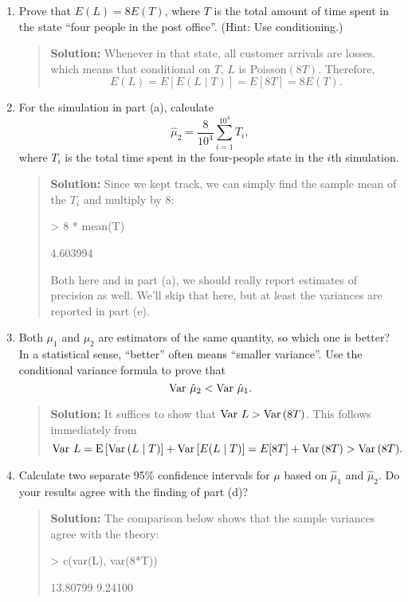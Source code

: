 \documentclass{article}
\def\E{\mathop{\rm E\,}\nolimits}
\def\Var{\mathop{\rm Var\,}\nolimits}
\begin{document}
\begin{enumerate}
\begin{enumerate}
    \item Prove that $E(L)=8E(T)$, where $T$ is the total amount of time spent
    in the state ``four people in the post office''. (Hint: Use conditioning.)
    \begin{quotation}{\bf Solution:}
    Whenever in that state, all customer arrivals are losses. which means
    that conditional on $T$, $L$ is Poisson$(8T)$.  Therefore,
    \[
    E(L) = E [ E(L\mid T)] = E[8T] = 8E(T).
    \]
    \end{quotation}

    \item For the simulation in part (a), calculate
    \[
    \hat\mu_2 = \frac{8}{10^4} \sum_{i=1}^{10^4} T_i,
    \]
    where $T_i$ is the total time spent in the four-people state in the $i$th
    simulation.
    \begin{quotation}{\bf Solution:}
    Since we kept track, we can simply find the sample mean of the $T_i$ and
    multiply by 8:
\begin{Schunk}
\begin{Sinput}
> 8 * mean(T)
\end{Sinput}
\begin{Soutput}
[1] 4.603994
\end{Soutput}
\end{Schunk}
    Both here and in part (a), we should really report estimates of precision as
    well.  We'll skip that here, but at least the variances are reported in part (e).
    \end{quotation}
    
    \item Both $\mu_1$ and $\mu_2$ are estimators of the same quantity, so which
    one is better? In a statistical sense, ``better'' often means ``smaller
    variance''. Use the conditional variance formula to prove that
    \[
    \Var \hat \mu_2 < \Var \hat\mu_1.
    \]
    \begin{quotation}{\bf Solution:}
    It suffices to show that $\Var L>\Var(8T)$.  This follows immediately from
    \[
    \Var L = \E [ \Var (L\mid T)] + \Var[ E(L\mid T)] = 
    E[ 8T ] + \Var (8T) > \Var (8T).
    \]
    \end{quotation}

    \item Calculate two separate 95\% confidence intervals for $\mu$ based on
    $\hat\mu_1$ and $\hat\mu_2$. Do your results agree with the finding of part
    (d)?
    \begin{quotation}{\bf Solution:}
    The comparison below shows that the sample variances agree with the theory:
\begin{Schunk}
\begin{Sinput}
> c(var(L), var(8*T))
\end{Sinput}
\begin{Soutput}
[1] 13.80799  9.24100
\end{Soutput}
\end{Schunk}
    \end{quotation}


\end{enumerate}
\end{enumerate}
\end{document}
